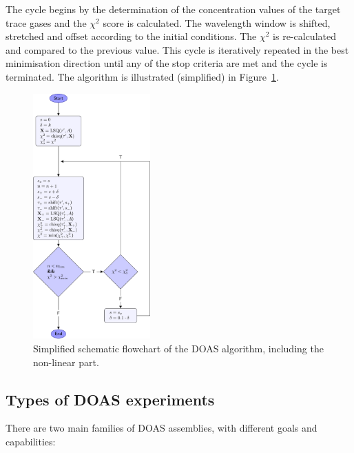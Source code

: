 The cycle begins by the determination of the concentration values of the
target trace gases and the $\chi^2$ score is calculated. The wavelength
window is shifted, stretched and offset according to the initial
conditions. The $\chi^2$ is re-calculated and compared to the previous
value. This cycle is iteratively repeated in the best minimisation
direction until any of the stop criteria are met and the cycle is
terminated. The algorithm is illustrated (simplified) in
Figure~\ref{fig:doas_non_linear}.

\begin{figure}[htpb]
    \centering
    \includegraphics[width=0.4\textwidth]{tikz/doasFlowchart/doasFlowchart.pdf}
    \caption{Simplified schematic flowchart of the \gls{DOAS} algorithm,
    including the non-linear part.}
    \label{fig:doas_non_linear}
\end{figure}

\subsection{ Types of \gls{DOAS} experiments}%
\label{sub:doas_categories}

There are two main families of \gls{DOAS} assemblies, with different
goals and capabilities:

